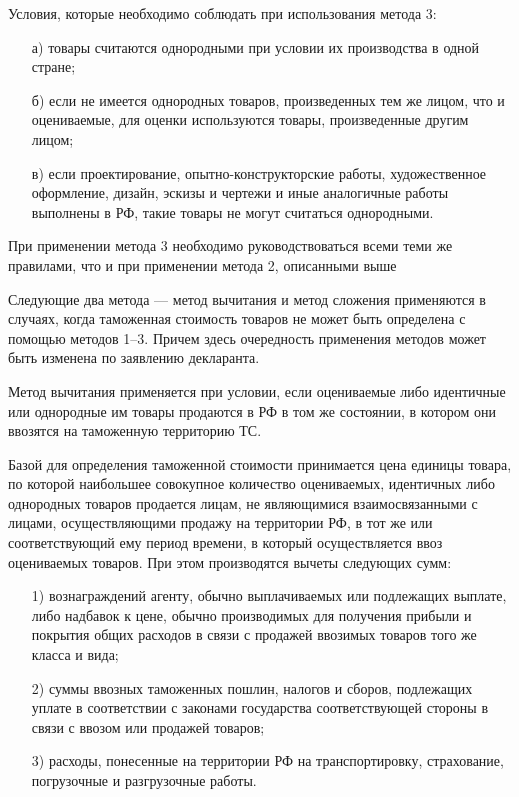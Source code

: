 Условия, которые необходимо соблюдать при использования метода 3:
\begin{enumerate}
	\item [а)] товары считаются однородными при условии их производства в одной стране;
	\item [б)] если не имеется однородных товаров, произведенных тем же лицом, что и оцениваемые, для оценки используются товары, произведенные другим лицом;
	\item [в)] если проектирование, опытно-конструкторские работы, художественное оформление, дизайн, эскизы и чертежи и иные аналогичные работы выполнены в РФ, такие товары не могут считаться однородными.
\end{enumerate}

При применении метода 3 необходимо руководствоваться всеми теми же правилами, что и при применении метода 2, описанными выше \cite[с. 265--270]{mahovikova}

Следующие два метода --- метод вычитания и метод сложения применяются в случаях, когда таможенная стоимость товаров не может быть определена с помощью методов 1--3. Причем здесь очередность применения методов может быть изменена по заявлению декларанта.

Метод вычитания применяется при условии, если оцениваемые либо идентичные или однородные им товары продаются в РФ в том же состоянии, в котором они ввозятся на таможенную территорию ТС.

Базой для определения таможенной стоимости принимается цена единицы товара, по которой наибольшее совокупное количество оцениваемых, идентичных либо однородных товаров продается лицам, не являющимися взаимосвязанными с лицами, осуществляющими продажу на территории РФ, в тот же или соответствующий ему период времени, в который осуществляется ввоз оцениваемых товаров. При этом производятся вычеты следующих сумм:
\begin{enumerate}
	\item [1)] вознаграждений агенту, обычно выплачиваемых или подлежащих выплате, либо надбавок к цене, обычно производимых для получения прибыли и покрытия общих расходов в связи с продажей ввозимых товаров того же класса и вида;
	\item [2)] суммы ввозных таможенных пошлин, налогов и сборов, подлежащих уплате в соответствии с законами государства соответствующей стороны в связи с ввозом или продажей товаров;
	\item [3)] расходы, понесенные на территории РФ на транспортировку, страхование, погрузочные и разгрузочные работы.
\end{enumerate}

